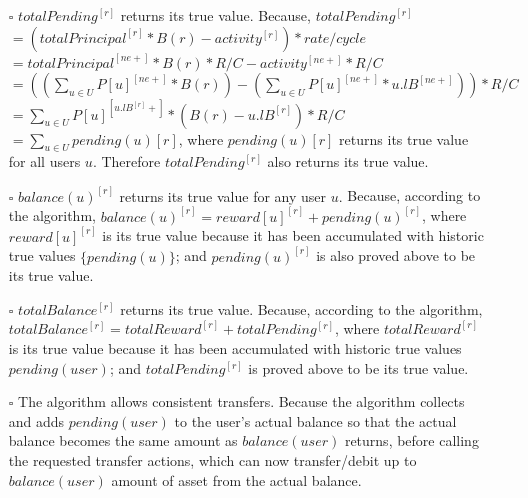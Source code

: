 \documentclass{article}
\begin{document}
\begin{itemize}
\begin{itemize}
    \item[$\square$] { $ totalPending^{[r]} $ returns its true value.}
    \newline \newline
    Because, $totalPending^{[r]}$
    \newline \newline
    $ = (totalPrincipal^{[r]} * B(r) - activity^{[r]}) * rate / cycle $
    \newline \newline
    $ = totalPrincipal^{[ne+]} * B(r) * R / C - activity^{[ne+]} * R / C $
    \newline \newline
    $ = ((\sum_{u \in U} P[u]^{[ne+]} * B(r)) - (\sum_{u \in U} P[u]^{[ne+]} * u.lB^{[ne+]})) * R / C$
    \newline \newline
    $ = \sum_{u \in U} P[u]^{[u.lB^{[r]}+]} * (B(r)-u.lB^{[r]}) * R / C $
    \newline \newline
    $ = \sum_{u \in U} pending(u){[r]} $,
    \newline \newline
    where $pending(u){[r]}$ returns its true value for all users $u$.
    Therefore $ totalPending^{[r]} $ also returns its true value.
    
    \item[$\square$] { $ balance(u)^{[r]}$ returns its true value for any user $u$.} \newline
    Because, according to the algorithm, $balance(u)^{[r]} = reward[u]^{[r]} + pending(u)^{[r]}$,
    where $reward[u]^{[r]}$ is its true value 
    because it has been accumulated with historic true values $\{pending(u)\}$; 
    and $pending(u)^{[r]}$ is also proved above to be its true value.

    \item[$\square$] { $ totalBalance^{[r]} $ returns its true value.} \newline
    Because, according to the algorithm, $totalBalance^{[r]} = totalReward^{[r]} + totalPending^{[r]}$,
    where $totalReward^{[r]}$ is its true value 
    because it has been accumulated with historic true values $pending(user)$;
    and $totalPending^{[r]}$ is proved above to be its true value.

    \item[$\square$] The algorithm allows consistent transfers. \newline
    Because the algorithm collects and adds $pending(user)$ to the user's actual balance 
    so that the actual balance becomes the same amount as $balance(user)$ returns, 
    before calling the requested transfer actions, which can now transfer/debit 
    up to $balance(user)$ amount of asset from the actual balance.
  \end{itemize}

\end{itemize}
\end{document}
